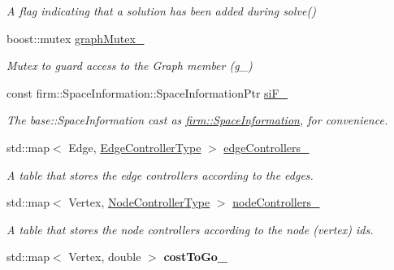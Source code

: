 \begin{DoxyCompactItemize}
\begin{DoxyCompactList}\small\item\em \-A flag indicating that a solution has been added during solve() \end{DoxyCompactList}\item 
\hypertarget{class_f_i_r_m_ae71c316b447bb7b404dc27c8d673fd55}{boost\-::mutex \hyperlink{class_f_i_r_m_ae71c316b447bb7b404dc27c8d673fd55}{graph\-Mutex\-\_\-}}\label{class_f_i_r_m_ae71c316b447bb7b404dc27c8d673fd55}

\begin{DoxyCompactList}\small\item\em \-Mutex to guard access to the \-Graph member (g\-\_\-) \end{DoxyCompactList}\item 
\hypertarget{class_f_i_r_m_afd4f91dc510bf7b5b68b4da5cfd90718}{const \*
firm\-::\-Space\-Information\-::\-Space\-Information\-Ptr \hyperlink{class_f_i_r_m_afd4f91dc510bf7b5b68b4da5cfd90718}{si\-F\-\_\-}}\label{class_f_i_r_m_afd4f91dc510bf7b5b68b4da5cfd90718}

\begin{DoxyCompactList}\small\item\em \-The base\-::\-Space\-Information cast as \hyperlink{classfirm_1_1_space_information}{firm\-::\-Space\-Information}, for convenience. \end{DoxyCompactList}\item 
\hypertarget{class_f_i_r_m_abfacc68b478054d0b99a3965d33d718a}{std\-::map$<$ \-Edge, \*
\hyperlink{class_f_i_r_m_a70abcb24fbc9f836b94119f65c8f8a37}{\-Edge\-Controller\-Type} $>$ \hyperlink{class_f_i_r_m_abfacc68b478054d0b99a3965d33d718a}{edge\-Controllers\-\_\-}}\label{class_f_i_r_m_abfacc68b478054d0b99a3965d33d718a}

\begin{DoxyCompactList}\small\item\em \-A table that stores the edge controllers according to the edges. \end{DoxyCompactList}\item 
\hypertarget{class_f_i_r_m_ac80211b920fb34ee04779c9af2c0d1c4}{std\-::map$<$ \-Vertex, \*
\hyperlink{class_controller}{\-Node\-Controller\-Type} $>$ \hyperlink{class_f_i_r_m_ac80211b920fb34ee04779c9af2c0d1c4}{node\-Controllers\-\_\-}}\label{class_f_i_r_m_ac80211b920fb34ee04779c9af2c0d1c4}

\begin{DoxyCompactList}\small\item\em \-A table that stores the node controllers according to the node (vertex) ids. \end{DoxyCompactList}\item 
\hypertarget{class_f_i_r_m_a2da49edf6ea58f4116cd3c31022bd693}{std\-::map$<$ \-Vertex, double $>$ {\bfseries cost\-To\-Go\-\_\-}}\label{class_f_i_r_m_a2da49edf6ea58f4116cd3c31022bd693}


\end{DoxyCompactItemize}
